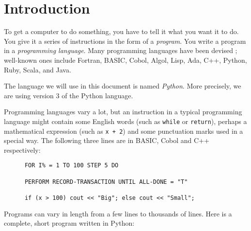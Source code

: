 \section{Introduction}



To get a computer to do something, you have to tell it what you want it
to do.  You give it a series of instructions in the form of a \emph{program}.
You write a program in a \emph{programming language}.
Many programming languages have been devised ;
well-known ones include
Fortran, BASIC, Cobol, Algol, Lisp, Ada, C++, Python, Ruby, Scala, and Java.


The language we will use in this document is named \emph{Python}.
More precisely, we are using version 3 of the Python language.

Programming languages vary a lot, but
an instruction in a typical programming language might contain
some English words (such as \verb!while! or \verb!return!), perhaps a mathematical
expression (such as \verb!x + 2!) and some punctuation marks used in a special way.
The following three lines are in BASIC, Cobol and C++ respectively:
\begin{Verbatim}
      FOR I% = 1 TO 100 STEP 5 DO

      PERFORM RECORD-TRANSACTION UNTIL ALL-DONE = "T"

      if (x > 100) cout << "Big"; else cout << "Small";
\end{Verbatim}

Programs can vary in length from a few lines to thousands of lines.
Here is a complete, short program written in Python:


